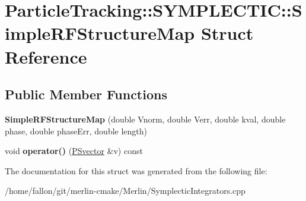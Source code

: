 \hypertarget{structParticleTracking_1_1SYMPLECTIC_1_1SimpleRFStructureMap}{}\section{Particle\+Tracking\+:\+:S\+Y\+M\+P\+L\+E\+C\+T\+IC\+:\+:Simple\+R\+F\+Structure\+Map Struct Reference}
\label{structParticleTracking_1_1SYMPLECTIC_1_1SimpleRFStructureMap}
\subsection*{Public Member Functions}
\begin{DoxyCompactItemize}
\item 
\mbox{\label{structParticleTracking_1_1SYMPLECTIC_1_1SimpleRFStructureMap_a9b84676e64c9af9f6cd04e21a5afa341}} 
{\bfseries Simple\+R\+F\+Structure\+Map} (double Vnorm, double Verr, double kval, double phase, double phase\+Err, double length)
\item 
\mbox{\label{structParticleTracking_1_1SYMPLECTIC_1_1SimpleRFStructureMap_a68fd363292e61817c41f1884faf0dce6}} 
void {\bfseries operator()} (\hyperlink{classPSvector}{P\+Svector} \&v) const
\end{DoxyCompactItemize}


The documentation for this struct was generated from the following file\+:\begin{DoxyCompactItemize}
\item 
/home/fallon/git/merlin-\/cmake/\+Merlin/Symplectic\+Integrators.\+cpp\end{DoxyCompactItemize}
